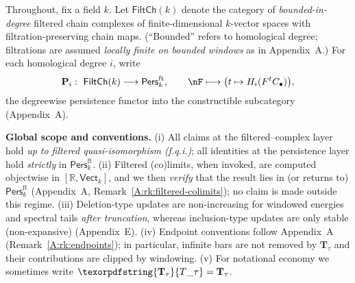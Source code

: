 \documentclass[11pt]{article}
\numberwithin{equation}{section}
\theoremstyle{plain}
\theoremstyle{definition}
\theoremstyle{remark}
\newcommand{\Pers}{\mathsf{Pers}}
\newcommand{\Vect}{\mathsf{Vect}}
\theoremstyle{plain}
\theoremstyle{definition}
\numberwithin{equation}{section}
\theoremstyle{definition}
\DeclareRobustCommand{\Ttau}{\texorpdfstring{\ensuremath{\mathbf{T}_{\tau}}}{T\_\tau}}
\numberwithin{equation}{section}
\theoremstyle{plain}
\theoremstyle{definition}
\theoremstyle{remark}
\providecommand{\Tfun}[1]{\mathbf{T}_{#1}}
\providecommand{\Ttau}{\Tfun{\tau}}
\begin{document}

\begingroup

Throughout, fix a field \(k\).
Let \(\mathsf{FiltCh}(k)\) denote the category of \emph{bounded-in-degree} filtered chain complexes of finite-dimensional \(k\)-vector spaces with filtration-preserving chain maps.
(“Bounded” refers to homological degree; filtrations are assumed \emph{locally finite on bounded windows} as in Appendix~A.)
For each homological degree \(i\), write
\[
\mathbf{P}_i:\ \mathsf{FiltCh}(k)\longrightarrow \Pers^{\mathrm{ft}}_k,\qquad\nF\longmapsto \big(t\mapsto H_i(F^{t}C_\bullet)\big),
\]
the degreewise persistence functor into the constructible subcategory (Appendix~A).

\medskip
\noindent\textbf{Global scope and conventions.}
(i) All claims at the filtered–complex layer hold \emph{up to filtered quasi-isomorphism (f.q.i.)}; all identities at the persistence layer hold \emph{strictly} in \(\Pers^{\mathrm{ft}}_k\).
(ii) Filtered (co)limits, when invoked, are computed objectwise in \([\mathbb{R},\Vect_k]\), and we then \emph{verify} that the result lies in (or returns to) \(\Pers^{\mathrm{ft}}_k\) (Appendix~A, Remark~\ref{A:rk:filtered-colimits}); no claim is made outside this regime.
(iii) Deletion-type updates are non-increasing for windowed energies and spectral tails \emph{after truncation}, whereas inclusion-type updates are only stable (non-expansive) (Appendix~E).
(iv) Endpoint conventions follow Appendix~A (Remark~\ref{A:rk:endpoints}); in particular, infinite bars are not removed by \(\mathbf{T}_\tau\) and their contributions are clipped by windowing.
(v) For notational economy we sometimes write \(\Ttau=\mathbf{T}_\tau\).

\end{document}
